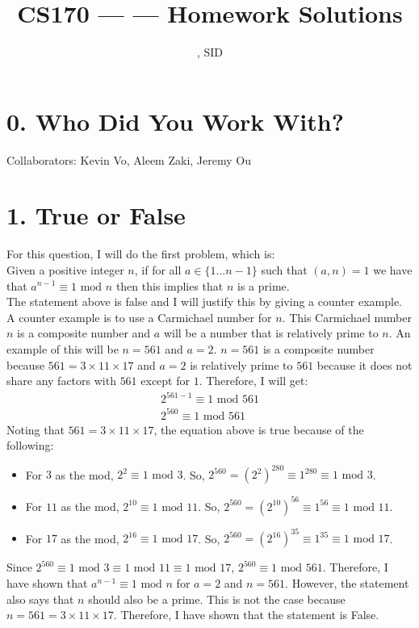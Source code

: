 \documentclass[11pt]{article}
\title{CS170 --- \Session --- Homework \Homework \space Solutions}
\author{\Name, SID \SID}
\date{}
\begin{document}
\maketitle

\section*{0. Who Did You Work With?}

Collaborators: Kevin Vo, Aleem Zaki, Jeremy Ou



\newpage
\section*{1. True or False}
For this question, I will do the first problem, which is:
\vspace*{1\baselineskip}
\\
Given a positive integer $n$, if for all $a \in \{1 ... n - 1\}$ such that $(a, n) = 1$ we have that $a^{n - 1} \equiv 1 \text{ mod } n$ then this implies that $n$ is a prime.
\vspace*{1\baselineskip}
\\
The statement above is false and I will justify this by giving a counter example. A counter example is to use a Carmichael number for $n$. This Carmichael number $n$ is a composite number and $a$ will be a number that is relatively prime to $n$. An example of this will be $n = 561$ and $a = 2$. $n = 561$ is a composite number because $561 = 3 \times 11 \times 17$ and $a = 2$ is relatively prime to $561$ because it does not share any factors with $561$ except for $1$. Therefore, I will get:
\begin{align*}
2^{561 - 1} \equiv 1 \text{ mod } 561 \\
2^{560} \equiv 1 \text{ mod } 561
\end{align*}
Noting that $561 = 3 \times 11 \times 17$, the equation above is true because of the following:
\begin{itemize}
\item
For $3$ as the mod, $2^{2} \equiv 1 \text{ mod } 3$. So, $2^{560} = \left(2^{2}\right)^{280} \equiv 1^{280} \equiv 1 \text{ mod } 3$.
\item
For $11$ as the mod, $2^{10} \equiv 1 \text{ mod } 11$. So, $2^{560} = \left(2^{10}\right)^{56} \equiv 1^{56} \equiv 1 \text{ mod } 11$.
\item
For $17$ as the mod, $2^{16} \equiv 1 \text{ mod } 17$. So, $2^{560} = \left(2^{16}\right)^{35} \equiv 1^{35} \equiv 1 \text{ mod } 17$.
\end{itemize}
Since $2^{560} \equiv 1 \text{ mod } 3 \equiv 1 \text{ mod } 11 \equiv 1 \text{ mod } 17 $, $2^{560} \equiv 1 \text{ mod } 561$. Therefore, I have shown that $a^{n - 1} \equiv 1 \text{ mod } n$ for $a = 2$ and $n = 561$. However, the statement also says that $n$ should also be a prime. This is not the case because $n = 561 = 3 \times 11 \times 17$. Therefore, I have shown that the statement is False.
\end{document}
